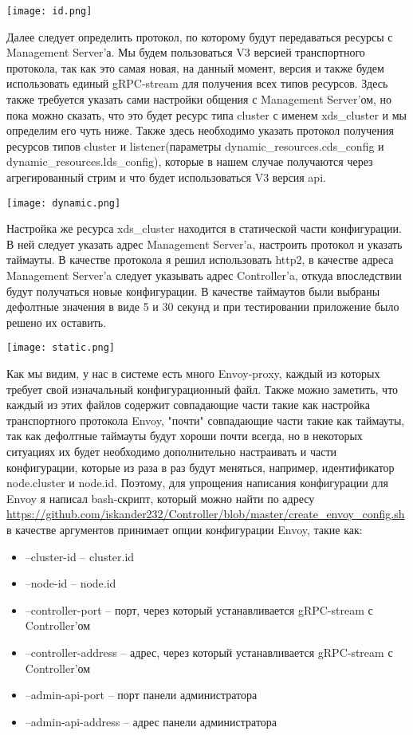 \texttt{[image: id.png]}

Далее следует определить протокол, по которому будут передаваться ресурсы с Management Server'а. Мы будем пользоваться V3 версией транспортного протокола, так как это самая новая, на данный момент, версия и также будем использовать единый gRPC-stream для получения всех типов ресурсов. Здесь также требуется указать сами настройки общения с Management Server'ом, но пока можно сказать, что это будет ресурс типа cluster с именем xds\_cluster и мы определим его чуть ниже. Также здесь необходимо указать протокол получения ресурсов типов cluster и listener(параметры dynamic\_resources.cds\_config и dynamic\_resources.lds\_config), которые в нашем случае получаются через агрегированный стрим и что будет использоваться V3 версия api.

\texttt{[image: dynamic.png]}

Настройка же ресурса xds\_cluster находится в статической части конфигурации. В ней следует указать адрес Management Server'a, настроить протокол и указать таймауты. В качестве протокола я решил использовать http2, в качестве адреса Management Server'a следует указывать адрес Controller'a, откуда впоследствии будут получаться новые конфигурации. В качестве таймаутов были выбраны дефолтные значения в виде 5 и 30 секунд и при тестировании приложение было решено их оставить.


\texttt{[image: static.png]}

Как мы видим, у нас в системе есть много Envoy-proxy, каждый из которых требует свой изначальный конфигурационный файл. Также можно заметить, что каждый из этих файлов содержит совпадающие части такие как настройка транспортного протокола Envoy, "почти" совпадающие части такие как таймауты, так как дефолтные таймауты будут хороши почти всегда, но в некоторых ситуациях их будет необходимо дополнительно настраивать и части конфигурации, которые из раза в раз будут меняться, например, идентификатор node.cluster и node.id. Поэтому, для упрощения написания конфигурации для Envoy я написал bash-скрипт, который можно найти по адресу \url{https://github.com/iskander232/Controller/blob/master/create_envoy_config.sh} в качестве аргументов принимает опции конфигурации Envoy, такие как:
\begin{itemize}
	\item --cluster-id -- cluster.id
	\item --node-id -- node.id
	\item --controller-port -- порт, через который устанавливается gRPC-stream с Controller'ом
	\item --controller-address -- адрес, через который устанавливается gRPC-stream с Controller'ом
	\item --admin-api-port -- порт панели администратора
	\item --admin-api-address -- адрес панели администратора
\end{itemize}

